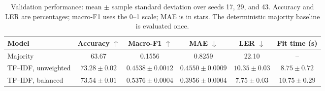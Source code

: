 \begin{table}[t]
\caption{Validation performance: mean $\pm$ sample standard deviation over seeds 17, 29, and 43. Accuracy and LER are percentages; macro-F1 uses the 0--1 scale; MAE is in stars. The deterministic majority baseline is evaluated once.}
\label{tab:baselines}
\centering\footnotesize
\begin{tabular}{@{}lccccc@{}}
\toprule
Model & Accuracy $\uparrow$ & Macro-F1 $\uparrow$ & MAE $\downarrow$ & LER $\downarrow$ & Fit time (s)\\\midrule
Majority & 63.67 & 0.1556 & 0.8259 & 22.10 & --\\
TF--IDF, unweighted & $73.28 \pm 0.02$ & $0.4538 \pm 0.0012$ & $0.4550 \pm 0.0009$ & $10.35 \pm 0.03$ & $8.75 \pm 0.72$\\
TF--IDF, balanced & $73.54 \pm 0.01$ & $0.5376 \pm 0.0004$ & $0.3956 \pm 0.0004$ & $7.75 \pm 0.03$ & $10.75 \pm 0.29$\\
\bottomrule
\end{tabular}

\end{table}
